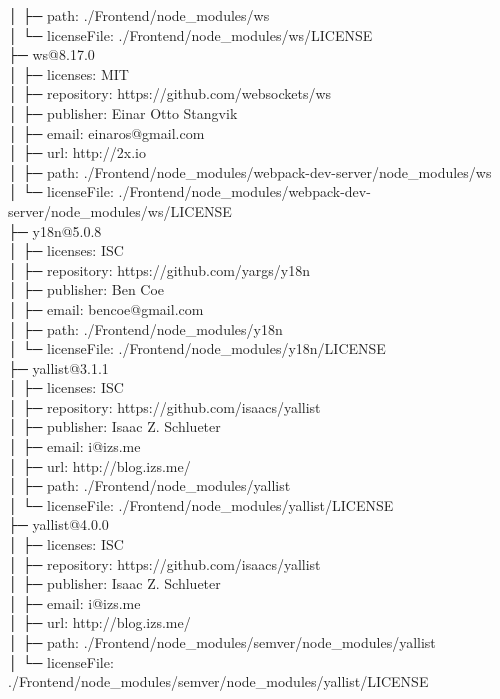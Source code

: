 │  ├─ path: ./Frontend/node\_modules/ws\\
│  └─ licenseFile: ./Frontend/node\_modules/ws/LICENSE\\
├─ ws@8.17.0\\
│  ├─ licenses: MIT\\
│  ├─ repository: https://github.com/websockets/ws\\
│  ├─ publisher: Einar Otto Stangvik\\
│  ├─ email: einaros@gmail.com\\
│  ├─ url: http://2x.io\\
│  ├─ path: ./Frontend/node\_modules/webpack-dev-server/node\_modules/ws\\
│  └─ licenseFile: ./Frontend/node\_modules/webpack-dev-server/node\_modules/ws/LICENSE\\
├─ y18n@5.0.8\\
│  ├─ licenses: ISC\\
│  ├─ repository: https://github.com/yargs/y18n\\
│  ├─ publisher: Ben Coe\\
│  ├─ email: bencoe@gmail.com\\
│  ├─ path: ./Frontend/node\_modules/y18n\\
│  └─ licenseFile: ./Frontend/node\_modules/y18n/LICENSE\\
├─ yallist@3.1.1\\
│  ├─ licenses: ISC\\
│  ├─ repository: https://github.com/isaacs/yallist\\
│  ├─ publisher: Isaac Z. Schlueter\\
│  ├─ email: i@izs.me\\
│  ├─ url: http://blog.izs.me/\\
│  ├─ path: ./Frontend/node\_modules/yallist\\
│  └─ licenseFile: ./Frontend/node\_modules/yallist/LICENSE\\
├─ yallist@4.0.0\\
│  ├─ licenses: ISC\\
│  ├─ repository: https://github.com/isaacs/yallist\\
│  ├─ publisher: Isaac Z. Schlueter\\
│  ├─ email: i@izs.me\\
│  ├─ url: http://blog.izs.me/\\
│  ├─ path: ./Frontend/node\_modules/semver/node\_modules/yallist\\
│  └─ licenseFile: ./Frontend/node\_modules/semver/node\_modules/yallist/LICENSE\\
